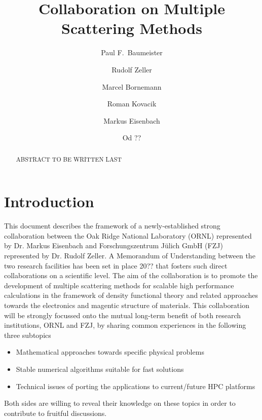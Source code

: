 \documentclass{llncs}
\begin{document}
\title{Collaboration on Multiple Scattering Methods}

\author{ 
  Paul F.~Baumeister 
  \and
  Rudolf Zeller
  \and
  Marcel Bornemann
  \and
  Roman Kovacik
  \and
  Markus Eisenbach
  \and
  Od ??
}


\maketitle
\thispagestyle{firstpage}

\begin{abstract}
  ABSTRACT TO BE WRITTEN LAST
\end{abstract}

\section{Introduction} \label{section:intro}
This document describes the framework of a newly-established strong collaboration
between the Oak Ridge National Laboratory (ORNL) represented by Dr. Markus Eisenbach
and Forschungszentrum J\"ulich GmbH (FZJ) represented by Dr. Rudolf Zeller.
A Memorandum of Understanding between the two research facilities has been set in place 20?? 
that fosters such direct collaborations on a scientific level.
The aim of the collaboration is to promote the development of multiple scattering methods
for scalable high performance calculations in the framework of density functional theory
and related approaches towards the electronics and magentic structure of materials.
This collaboration will be strongly focussed onto the mutual long-term benefit of both research institutions, 
ORNL and FZJ, by sharing common experiences in the following three subtopics
\begin{itemize}
 \item Mathematical approaches towards specific physical problems  
 \item Stable numerical algorithms suitable for fast solutions
 \item Technical issues of porting the applications to current/future HPC platforms
\end{itemize}
Both sides are willing to reveal their knowledge on these topics in order to
contribute to fruitful discussions.
\end{document}
